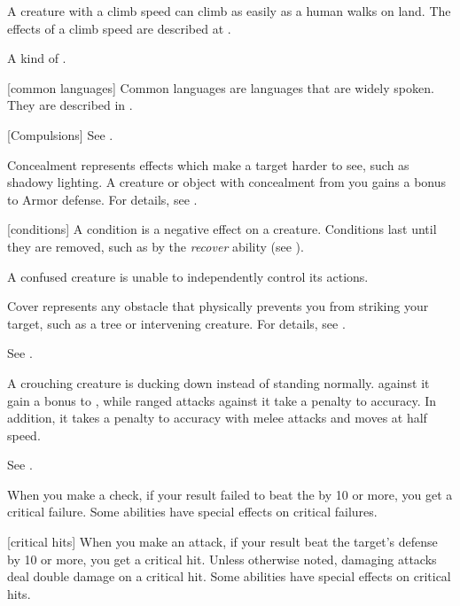  A creature with a climb speed can climb as easily as a human walks on land.
The effects of a climb speed are described at .

 A kind of .

[common languages] Common languages are languages that are widely spoken.
They are described in .

[Compulsions] See .

 Concealment represents effects which make a target harder to see, such as shadowy lighting.
A creature or object with concealment from you gains a  bonus to Armor defense.
For details, see .

[conditions] A condition is a negative effect on a creature.
Conditions last until they are removed, such as by the \textit{recover} ability (see ).

 A confused creature is unable to independently control its actions. \confusionexplanation

 Cover represents any obstacle that physically prevents you from striking your target, such as a tree or intervening creature.
For details, see .

 See .

 A crouching creature is ducking down instead of standing normally.
 against it gain a  bonus to , while  ranged attacks against it take a  penalty to accuracy.
In addition, it takes a  penalty to accuracy with melee attacks and moves at half speed.

 See .

 When you make a check, if your result failed to beat the  by 10 or more, you get a critical failure.
Some abilities have special effects on critical failures.

[critical hits] When you make an attack, if your result beat the target's defense by 10 or more, you get a critical hit.
Unless otherwise noted, damaging attacks deal double damage on a critical hit.
Some abilities have special effects on critical hits.

